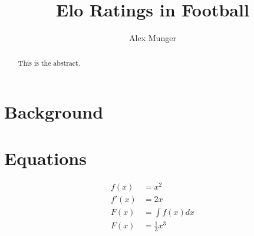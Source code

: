 \documentclass{article}
\title{Elo Ratings in Football}
\author{Alex Munger}
\begin{document}
\maketitle

\begin{abstract}
	This is the abstract.
\end{abstract}

\section{Background}

\section{Equations}

\begin{align*}
	f(x) &= x^2\\
	f'(x) &= 2x\\
	F(x) &= \int f(x)dx\\
	F(x) &= \frac{1}{3}x^3
\end{align*}
\end{document}
